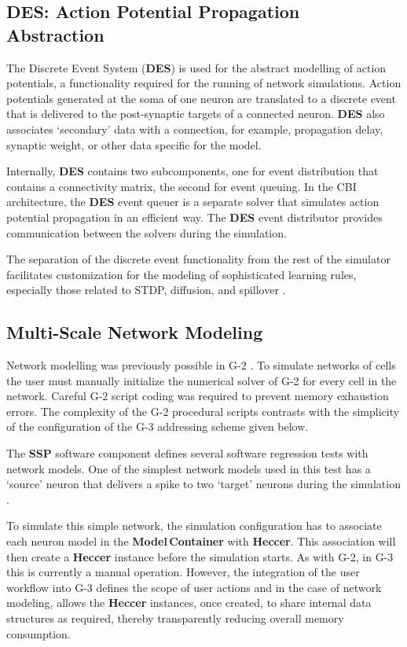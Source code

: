 \documentclass[11pt,3p,twocolumn]{JMN}
\begin{document}
\subsection{DES: Action Potential Propagation Abstraction}

The Discrete Event System ({\bf DES}) is used for the abstract modelling of action potentials, a functionality required for the running of network simulations.  Action potentials generated at the soma of one neuron are translated to a discrete event that is delivered to the post-synaptic targets of a connected neuron.  {\bf  DES} also associates `secondary' data with a connection, for example, propagation delay, synaptic weight, or other data specific for the model.

Internally, {\bf DES} contains two subcomponents, one for event distribution that contains a connectivity matrix, the second for event queuing.  In the CBI architecture, the {\bf DES} event queuer is a separate solver that simulates action potential propagation in an efficient way.  The {\bf DES} event distributor provides communication between the solvers during the simulation.

The separation of the discrete event functionality from the rest of the simulator facilitates customization for the modeling of sophisticated learning rules, especially those related to STDP, diffusion, and spillover \cite{roberts02:_spike, nowotny03:_enhan}.

\subsection{Multi-Scale Network Modeling}

Network modelling was previously possible in G-2 \cite{cornelis02:_tutor}.  To simulate networks of cells the user must manually initialize the numerical solver of G-2 for every cell in the network.  Careful G-2 script coding was required to prevent memory exhaustion errors.  The complexity of the G-2 procedural scripts contrasts with the simplicity of the configuration of the G-3 addressing scheme given below.

The {\bf SSP} software component defines several software regression tests with network models.  One of the simplest network models used in
this test has a `source' neuron that delivers a spike to two `target' neurons during the simulation .

To simulate this simple network, the simulation configuration has to associate each neuron model in the {\bf Model\,Container} with {\bf   Heccer}.  This association will then create a {\bf Heccer} instance before the simulation starts.  As with G-2, in G-3 this is currently a manual operation.
However, the integration of the user workflow into G-3 defines the scope of user actions and in the case of network modeling, allows the {\bf Heccer} instances, once created, to share internal data structures as required, thereby transparently reducing overall memory consumption.
\end{document}
